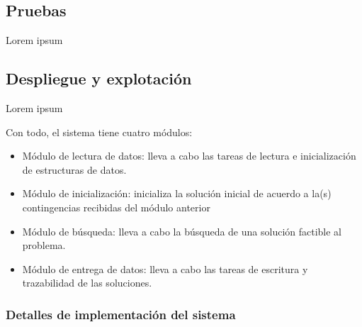 \subsection{Pruebas}
Lorem ipsum

\subsection{Despliegue y explotación} 
\label{sec:4:despliegue}

Lorem ipsum






















Con todo, el sistema tiene cuatro módulos:
\begin{itemize}
	\item Módulo de lectura de datos: lleva a cabo las tareas de lectura e inicialización de estructuras de datos.
	\item Módulo de inicialización: inicializa la solución inicial de acuerdo a la(s) contingencias recibidas del módulo anterior
	\item Módulo de búsqueda: lleva a cabo la búsqueda de una solución factible al problema.
	\item Módulo de entrega de datos: lleva a cabo las tareas de escritura y trazabilidad de las soluciones.
\end{itemize}









\subsubsection{Detalles de implementación del sistema}
\label{sec:detalles-impl-sistema}
